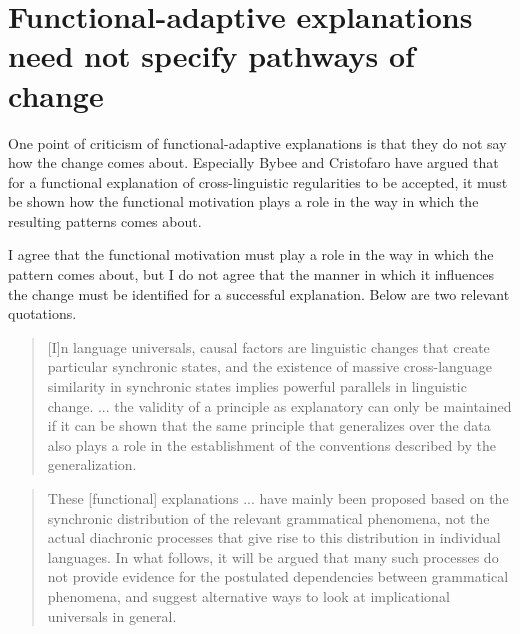 \documentclass[output=paper]{langsci/langscibook}
\begin{document}
\section{Functional-adaptive explanations need not specify pathways of change}

One point of criticism of functional-adaptive explanations is that they do not say how the change comes about. Especially Bybee and Cristofaro have argued that for a functional explanation of cross-linguistic regularities to be accepted, it must be shown how the functional motivation plays a role in the way in which the resulting patterns comes about.

I agree that the functional motivation must play a role in the way in which the pattern comes about, but I do not agree that the manner in which it influences the change must be identified for a successful explanation. Below are two relevant quotations.

\begin{quote}
[I]n language universals, causal factors are linguistic changes that create particular synchronic states, and the existence of massive cross-language similarity in synchronic states implies powerful parallels in linguistic change. ... the validity of a principle as explanatory can only be maintained if it can be shown that the same principle that generalizes over the data also plays a role in the establishment of the conventions described by the generalization. \citep[352]{Bybee1988}
\end{quote}

\begin{quote}
These [functional] explanations ... have mainly been proposed based on the synchronic distribution of the relevant grammatical phenomena, not the actual diachronic processes that give rise to this distribution in individual languages. In what follows, it will be argued that many such processes do not provide evidence for the postulated dependencies between grammatical phenomena, and suggest alternative ways to look at implicational universals in general. \citep[10]{Cristofaro2017}
\end{quote}
\end{document}
